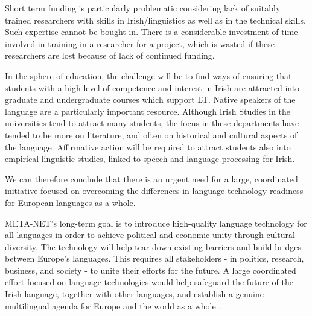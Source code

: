 \begin{multicols}{2}
Short term funding is particularly problematic considering lack of suitably trained researchers with skills in Irish/linguistics as well as in the technical skills. Such expertise cannot be bought in. There is a considerable investment of time involved in training in a researcher for a project, which is wasted if these researchers are lost because of lack of continued funding. 

In the sphere of education, the challenge will be to find ways of ensuring that students with a high level of competence and interest in Irish are attracted into graduate and undergraduate courses which support LT. Native speakers of the language are a particularly important resource. Although Irish Studies in the universities tend to attract many students, the focus in these departments have tended to be more on literature, and often on historical  and cultural aspects of the language. Affirmative action will be required to attract students also into empirical linguistic studies, linked to speech and language processing for Irish.






We can therefore conclude that there is an urgent need for a large, coordinated initiative focused on overcoming the differences in language technology readiness for European languages as a whole.

META-NET’s long-term goal is to introduce high-quality language technology for all languages in order to achieve political and economic unity through cultural diversity. The technology will help tear down existing barriers and build bridges between Europe’s languages. This requires all stakeholders - in politics, research, business, and society - to unite their efforts for the future. A large coordinated effort focused on language technologies would help safeguard the future of the Irish language, together with other languages, and establish a genuine multilingual agenda for Europe and the world as a whole \cite{tcstar}. 


\end{multicols}

\clearpage


